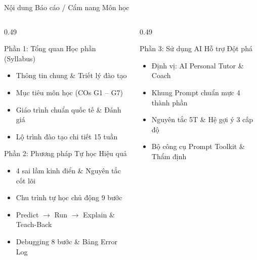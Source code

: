 \documentclass[aspectratio=169, 10pt]{beamer}
\begin{document}
\begin{frame}{Nội dung Báo cáo / Cẩm nang Môn học}
  \begin{columns}[T]
    \begin{column}{0.49\textwidth}
      \begin{cbox}[primaryblue]{Phần 1: Tổng quan Học phần (Syllabus)}
        \footnotesize
        \begin{itemize}\setlength{\itemsep}{1pt}
          \item Thông tin chung \& Triết lý đào tạo
          \item Mục tiêu môn học (COs G1 -- G7)
          \item Giáo trình chuẩn quốc tế \& Đánh giá
          \item Lộ trình đào tạo chi tiết 15 tuần
        \end{itemize}
      \end{cbox}
      \vspace{0.1cm}
      \begin{cbox}[secondarygreen]{Phần 2: Phương pháp Tự học Hiệu quả}
        \footnotesize
        \begin{itemize}\setlength{\itemsep}{1pt}
          \item 4 sai lầm kinh điển \& Nguyên tắc cốt lõi
          \item Chu trình tự học chủ động 9 bước
          \item Predict $\rightarrow$ Run $\rightarrow$ Explain \& Teach-Back
          \item Debugging 8 bước \& Bảng Error Log
        \end{itemize}
      \end{cbox}
    \end{column}
    \begin{column}{0.49\textwidth}
      \begin{cbox}[accentorange]{Phần 3: Sử dụng AI Hỗ trợ Đột phá}
        \footnotesize
        \begin{itemize}\setlength{\itemsep}{1pt}
          \item Định vị: AI Personal Tutor \& Coach
          \item Khung Prompt chuẩn mực 4 thành phần
          \item Nguyên tắc 5T \& Hệ gợi ý 3 cấp độ
          \item Bộ công cụ Prompt Toolkit \& Thẩm định

\end{itemize}
\end{cbox}
\end{column}
\end{columns}
\end{frame}
\end{document}

